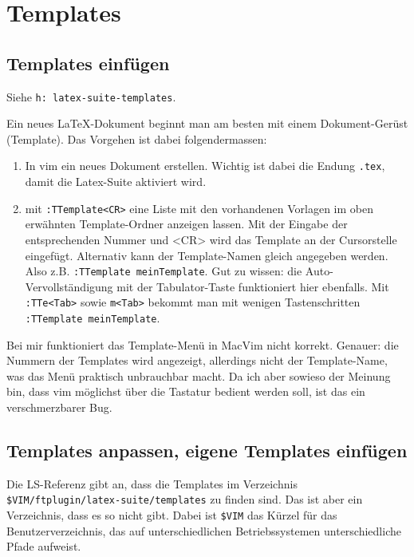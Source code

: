 \documentclass[a4paper,parskip=half,draft=true,DIV=15]{scrartcl}
\newcommand{\LS}{Latex-Suite}
\newcommand{\vimhNP}[1]{\texttt{h: #1}}
\begin{document}
\section{Templates}

\subsection{Templates einfügen}

Siehe \vimhNP{latex-suite-templates}.

Ein neues LaTeX-Dokument beginnt man am besten mit einem Dokument-Gerüst
(Template). Das Vorgehen ist dabei folgendermassen:

\begin{enumerate}
  
  \item In vim ein neues Dokument erstellen. Wichtig ist dabei die Endung
    \texttt{.tex}, damit die \LS{} aktiviert wird.

  \item mit \texttt{:TTemplate<CR>} eine Liste mit den vorhandenen
    Vorlagen im oben erwähnten Template-Ordner anzeigen lassen. Mit der
    Eingabe der entsprechenden Nummer und <CR> wird das Template an der
    Cursorstelle eingefügt. Alternativ kann der Template-Namen gleich angegeben
    werden. Also z.B. \texttt{:TTemplate meinTemplate}. Gut zu wissen: die
    Auto-Vervollständigung mit der Tabulator-Taste funktioniert hier ebenfalls.
    Mit \texttt{:TTe<Tab>} sowie \texttt{m<Tab>} bekommt man mit wenigen Tastenschritten
    \texttt{:TTemplate meinTemplate}.

\end{enumerate}

Bei mir funktioniert das Template-Menü in MacVim nicht korrekt. Genauer: die Nummern der Templates
wird angezeigt, allerdings nicht der Template-Name, was das Menü praktisch unbrauchbar macht.
Da ich aber sowieso der Meinung bin, dass vim möglichst über die Tastatur bedient werden soll,
ist das ein verschmerzbarer Bug.

\subsection{Templates anpassen, eigene Templates einfügen}

Die LS-Referenz gibt an, dass die Templates im Verzeichnis \texttt{\$VIM/ftplugin/latex-suite/templates} zu finden sind.
Das ist aber ein Verzeichnis, dass es so nicht gibt.
Dabei ist \texttt{\$VIM} das Kürzel für das Benutzerverzeichnis, das auf unterschiedlichen Betriebssystemen unterschiedliche Pfade aufweist.
\end{document}
